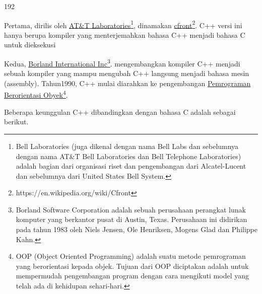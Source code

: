 \begin{dingautolist}{192}

\item
  Pertama, dirilis oleh
  \href{https://id.wikipedia.org/wiki/Bell_Laboratories}{AT\&T
  Laboratories}\footnote{Bell Laboratories (juga dikenal dengan nama Bell Labs dan sebelumnya dengan nama AT\&T Bell Laboratories dan Bell Telephone Laboratories) adalah bagian dari organisasi riset dan pengembangan dari Alcatel-Lucent dan sebelumnya dari United States Bell System.}, dinamakan
  \href{https://en.wikipedia.org/wiki/Cfront}{cfront}\footnote{https://en.wikipedia.org/wiki/Cfront}. C++ versi ini
  hanya berupa kompiler yang menterjemahkan bahasa C++ menjadi bahasa C
  untuk dieksekusi
\item
  Kedua, \href{https://en.wikipedia.org/wiki/Borland}{Borland
  International Inc}\footnote{Borland Software Corporation adalah sebuah perusahaan perangkat lunak komputer yang berkantor pusat di Austin, Texas. Perusahaan ini didirikan pada tahun 1983 oleh Niels Jensen, Ole Henriksen, Mogens Glad dan Philippe Kahn.}. mengembangkan kompiler C++ menjadi sebuah kompiler
  yang mampu mengubah C++ langsung menjadi bahasa mesin (assembly).
  Tahun1990, C++ mulai diarahkan ke pengembangan
  \href{https://id.wikipedia.org/wiki/Pemrograman_berorientasi_objek}{Pemrograman
  Berorientasi Obyek}\footnote{OOP (Object Oriented Programming) adalah suatu metode pemrograman yang berorientasi kepada objek. Tujuan dari OOP diciptakan adalah untuk mempermudah pengembangan program dengan cara mengikuti model yang telah ada di kehidupan sehari-hari.}.

\end{dingautolist}

Beberapa keunggulan C++ dibandingkan dengan bahasa C adalah sebagai
berikut.

